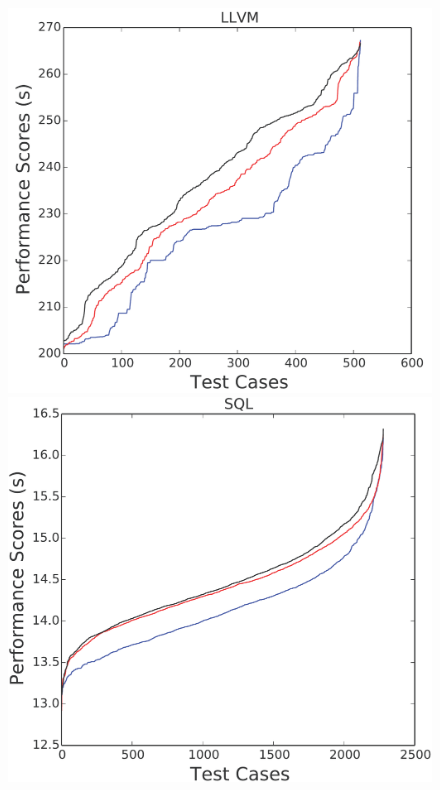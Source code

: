 \documentclass[conference]{IEEEtran}
\begin{document}
{\begin{figure}[htbp!]
\begin{minipage}{0.30\linewidth}
\includegraphics[width=\linewidth]{_figs/LLVM.pdf}
\end{minipage}
\begin{minipage}{0.30\linewidth}
\includegraphics[width=\linewidth]{_figs/SQL.pdf}
\end{minipage}
\begin{minipage}{0.30\linewidth}

\end{minipage}
\end{figure}}
\end{document}
